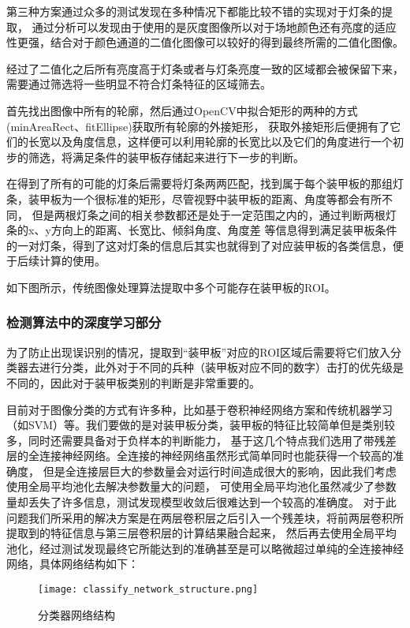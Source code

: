 第三种方案通过众多的测试发现在多种情况下都能比较不错的实现对于灯条的提取，
通过分析可以发现由于使用的是灰度图像所以对于场地颜色还有亮度的适应性更强，结合对于颜色通道的二值化图像可以较好的得到最终所需的二值化图像。\par

经过了二值化之后所有亮度高于灯条或者与灯条亮度一致的区域都会被保留下来，需要通过筛选将一些明显不符合灯条特征的区域筛去。\par

首先找出图像中所有的轮廓，然后通过OpenCV中拟合矩形的两种的方式(minAreaRect、fitEllipse)获取所有轮廓的外接矩形，
获取外接矩形后便拥有了它们的长宽以及角度信息，这样便可以利用轮廓的长宽比以及它们的角度进行一个初步的筛选，将满足条件的装甲板存储起来进行下一步的判断。\par

在得到了所有的可能的灯条后需要将灯条两两匹配，找到属于每个装甲板的那组灯条，装甲板为一个很标准的矩形，尽管视野中装甲板的距离、角度等都会有所不同，
但是两根灯条之间的相关参数都还是处于一定范围之内的，通过判断两根灯条的x、y方向上的距离、长宽比、倾斜角度、角度差
等信息得到满足装甲板条件的一对灯条，得到了这对灯条的信息后其实也就得到了对应装甲板的各类信息，便于后续计算的使用。\par
如下图所示，传统图像处理算法提取中多个可能存在装甲板的ROI。

\subsubsection{检测算法中的深度学习部分}

为了防止出现误识别的情况，提取到“装甲板”对应的ROI区域后需要将它们放入分类器去进行分类，此外对于不同的兵种（装甲板对应不同的数字）击打的优先级是不同的，因此对于装甲板类别的判断是非常重要的。\par
目前对于图像分类的方式有许多种，比如基于卷积神经网络方案和传统机器学习（如SVM）等。我们要做的是对装甲板分类，装甲板的特征比较简单但是类别较多，同时还需要具备对于负样本的判断能力，
基于这几个特点我们选用了带残差层的全连接神经网络。全连接的神经网络虽然形式简单同时也能获得一个较高的准确度，
但是全连接层巨大的参数量会对运行时间造成很大的影响，因此我们考虑使用全局平均池化去解决参数量大的问题，
可使用全局平均池化虽然减少了参数量却丢失了许多信息，测试发现模型收敛后很难达到一个较高的准确度。
对于此问题我们所采用的解决方案是在两层卷积层之后引入一个残差块，将前两层卷积所提取到的特征信息与第三层卷积层的计算结果融合起来，
然后再去使用全局平均池化，经过测试发现最终它所能达到的准确甚至是可以略微超过单纯的全连接神经网络，具体网络结构如下：\par
\begin{figure}[H]
    \centering
    \texttt{[image: classify\_network\_structure.png]} %
    \caption{分类器网络结构} %
\end{figure}

